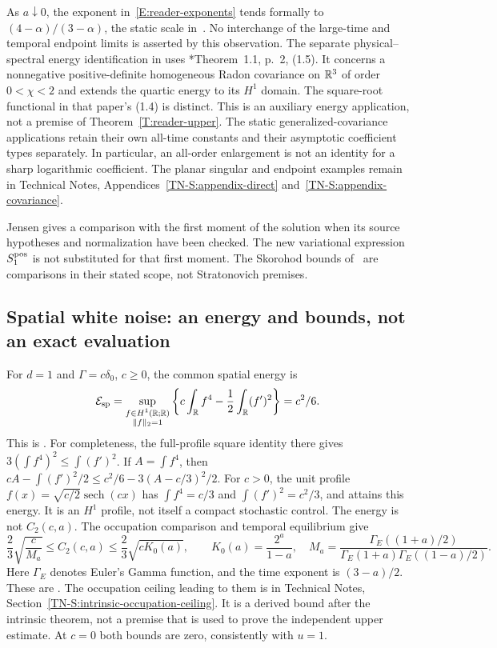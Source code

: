 As $a\downarrow0$, the exponent in~\eqref{E:reader-exponents} tends formally to
$(4-\alpha)/(3-\alpha)$, the static scale in~\cite{chen.hu:25:hyperbolic}. No
interchange of the large-time and temporal endpoint limits is asserted by this
observation. The separate physical--spectral energy identification in
 uses
\cite{chen:23:exponential}*{Theorem~1.1, p.~2, (1.5)}. It concerns a nonnegative
positive-definite homogeneous Radon covariance on $\mathbb R^3$ of order $0 < \chi < 2$
and extends the quartic energy to its $H^1$ domain. The square-root functional
in that paper's (1.4) is distinct. This is an auxiliary energy application, not
a premise of Theorem~\ref{T:reader-upper}. The static generalized-covariance
applications retain their own all-time constants and their asymptotic
coefficient types separately. In particular, an all-order enlargement is not an
identity for a sharp logarithmic coefficient. The planar singular and endpoint
examples remain in Technical Notes, Appendices~\ref{TN-S:appendix-direct}
and~\ref{TN-S:appendix-covariance}.

Jensen gives a comparison with the first moment of the solution when its source
hypotheses and normalization have been checked. The new variational expression
$S^{\mathrm{pos}}_1$ is not substituted for that first moment. The Skorohod bounds
of~\cite{balan.conus:16:intermittency} are comparisons in their stated scope,
not Stratonovich premises.

\subsection{Spatial white noise: an energy and bounds, not an exact evaluation}

For $d = 1$ and $\Gamma = c\delta_0$, $c \ge 0$, the common spatial energy is
\[
  \mathcal{E}_{\rm sp}
  =\sup_{\substack{f\in H^1(\mathbb R;\mathbb R)\\\|f\|_2=1}}
  \left\{c\int_\mathbb R f^4-\frac12\int_\mathbb R(f')^2\right\}=c^2/6.
\]
This is . For completeness, the
full-profile square identity there gives $3(\int f^4)^2 \le \int(f')^2$. If $A =
\int f^4$, then $cA-\int(f')^2/2 \le c^2/6-3(A-c/3)^2/2$. For $c > 0$, the unit
profile $f(x) = \sqrt{c/2}\operatorname{sech}(cx)$ has $\int f^4 = c/3$ and
$\int(f')^2 = c^2/3$, and attains this energy. It is an $H^1$ profile, not
itself a compact stochastic control. The energy is not $C_2(c,a)$. The
occupation comparison and temporal equilibrium give
\begin{equation}\label{E:reader-white-bounds}
  \frac23\sqrt{\frac{c}{M_a}}
  \le C_2(c,a)\le\frac23\sqrt{cK_0(a)},\qquad
  K_0(a)=\frac{2^a}{1-a},\quad
  M_a=\frac{\Gamma_E((1+a)/2)}
  {\Gamma_E(1+a)\Gamma_E((1-a)/2)}.
\end{equation}
Here $\Gamma_E$ denotes Euler's Gamma function, and the time exponent is
$(3-a)/2$. These are . The occupation
ceiling leading to them is in Technical Notes,
Section~\ref{TN-S:intrinsic-occupation-ceiling}. It is a derived bound
after the intrinsic theorem, not a premise that is used to prove the independent
upper estimate. At $c = 0$ both bounds are zero, consistently with $u = 1$.

